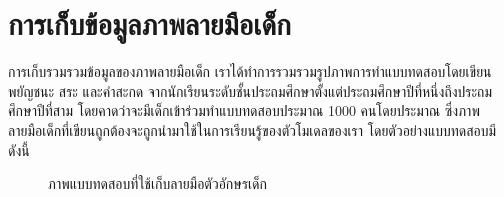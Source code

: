 \documentclass[12pt,oneside,openright,a4paper]{cpe-thai-project}
\begin{document}
\section{การเก็บข้อมูลภาพลายมือเด็ก}
การเก็บรวมรวมข้อมูลของภาพลายมือเด็ก เราได้ทำการรวมรวมรูปภาพการทำแบบทดสอบโดยเขียนพยัญชนะ สระ และคำสะกด 
จากนักเรียนระดับชั้นประถมศึกษาตั้งแต่ประถมศึกษาปีที่หนึ่งถึงประถมศึกษาปีที่สาม โดยคาดว่าจะมีเด็กเข้าร่วมทำแบบทดสอบประมาณ 1000 
คนโดยประมาณ ซึ่งภาพลายมือเด็กที่เขียนถูกต้องจะถูกนำมาใช้ในการเรียนรู้ของตัวโมเดลของเรา โดยตัวอย่างแบบทดสอบมีดังนี้
\begin{figure}[!ht]\centering
  \setlength{\fboxrule}{0.2mm} %
  \setlength{\fboxsep}{1cm}
  \caption{ภาพแบบทดสอบที่ใช้เก็บลายมือตัวอักษรเด็ก}\label{fig:system}
    
\end{figure}
\end{document}
